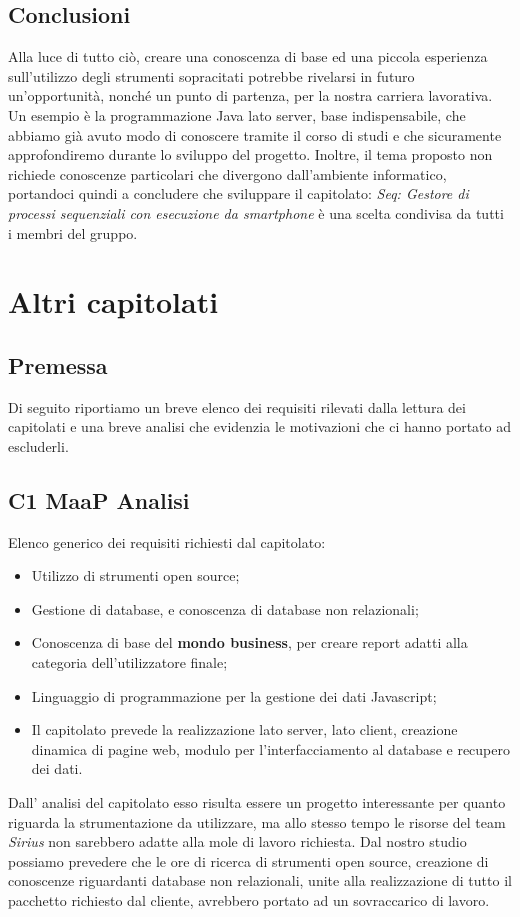 \subsection{Conclusioni}
 Alla luce di tutto ciò, creare una conoscenza di base ed una piccola esperienza sull'utilizzo degli strumenti sopracitati potrebbe rivelarsi in futuro un'opportunità, nonché un punto di partenza, per la nostra carriera lavorativa. Un esempio è la programmazione Java lato server, base indispensabile, che abbiamo già avuto modo di conoscere tramite il corso di studi e che sicuramente approfondiremo durante lo sviluppo del progetto. Inoltre, il tema proposto non richiede conoscenze particolari che divergono dall'ambiente informatico, portandoci quindi a concludere che sviluppare il capitolato: \textit{Seq: Gestore di processi sequenziali con esecuzione da smartphone} è una scelta condivisa da tutti i membri del gruppo. \\

\section{Altri capitolati}
\subsection{Premessa}
Di seguito riportiamo un breve elenco dei requisiti rilevati dalla lettura dei capitolati e una breve analisi che evidenzia le motivazioni che ci hanno portato ad escluderli.\\
\subsection{C1 MaaP Analisi}
Elenco generico dei requisiti richiesti dal capitolato:
\begin{itemize} 
\item Utilizzo di strumenti open source;
\item Gestione di database, e conoscenza di database non relazionali;
\item Conoscenza di base del \textbf{mondo business}, per creare report adatti alla categoria dell'utilizzatore finale;
\item Linguaggio di programmazione per la gestione dei dati Javascript;
\item Il capitolato prevede la realizzazione lato server, lato client, creazione dinamica di pagine web, modulo per l'interfacciamento al database e recupero dei dati.
\end{itemize}
Dall' analisi del capitolato esso risulta essere un progetto interessante per quanto riguarda la strumentazione da utilizzare, ma allo stesso tempo le risorse del team \textit{Sirius} non sarebbero adatte alla mole di lavoro richiesta. Dal nostro studio possiamo prevedere che le ore di ricerca di strumenti open source, creazione di conoscenze riguardanti database non relazionali, unite alla realizzazione di tutto il pacchetto richiesto dal cliente, avrebbero portato ad un sovraccarico di lavoro.
\\
